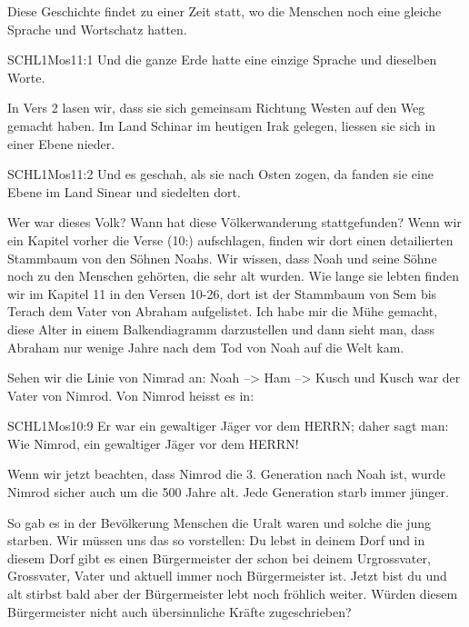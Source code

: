 \documentclass[12pt]{../../inc/mybib}
\newenvironment{block}[1][]{%
  \vspace{1.5em}%
  \noindent\textbf{#1}\par%
  \vspace{0.0em}%
}{%
  \vspace{1em}%
}
\begin{document}
    \vspace{1em}
    \begin{block}
    Diese Geschichte findet zu einer Zeit statt, wo die Menschen noch eine gleiche Sprache und Wortschatz hatten.
    \begin{bibelbox}{SCHL}{1Mos}{11:1}
        Und die ganze Erde hatte eine einzige Sprache und dieselben Worte.
    \end{bibelbox}    
    In Vers 2 lasen wir, dass sie sich gemeinsam Richtung Westen auf den Weg gemacht haben. Im Land Schinar im heutigen Irak gelegen, liessen sie sich in einer Ebene nieder.    
    \begin{bibelbox}{SCHL}{1Mos}{11:2}
        Und es geschah, als sie nach Osten zogen, da fanden sie eine Ebene im Land Sinear und siedelten dort.
    \end{bibelbox}
    Wer war dieses Volk? Wann hat diese Völkerwanderung stattgefunden? Wenn wir ein Kapitel vorher die Verse  (10:) aufschlagen, finden wir dort einen detailierten Stammbaum von den Söhnen Noahs. Wir wissen, dass Noah und seine Söhne noch zu den Menschen gehörten, die sehr alt wurden. Wie lange sie lebten finden wir im Kapitel 11 in den Versen 10-26, dort ist der Stammbaum von Sem bis Terach dem Vater von Abraham aufgelistet. Ich habe mir die Mühe gemacht, diese Alter in einem Balkendiagramm darzustellen und dann sieht man, dass Abraham nur wenige Jahre nach dem Tod von Noah auf die Welt kam. 

    
    Sehen wir die Linie von Nimrad an: Noah --> Ham --> Kusch und Kusch war der Vater von Nimrod.
    Von Nimrod heisst es in:
    \begin{bibelbox}{SCHL}{1Mos}{10:9}
        Er war ein gewaltiger Jäger vor dem HERRN; daher sagt man: Wie Nimrod, ein gewaltiger Jäger vor dem HERRN!
    \end{bibelbox}
    Wenn wir jetzt beachten, dass Nimrod die 3. Generation nach Noah ist, wurde Nimrod sicher auch um die 500 Jahre alt. Jede Generation starb immer jünger. 
\end{block}
\begin{block}
    So gab es in der Bevölkerung Menschen die Uralt waren und solche die jung starben. Wir müssen uns das so vorstellen:  Du lebst in deinem Dorf und in diesem Dorf gibt es einen Bürgermeister der schon bei deinem Urgrossvater, Grossvater, Vater und aktuell immer noch Bürgermeister ist. Jetzt bist du und alt stirbst bald aber der Bürgermeister lebt noch fröhlich weiter. Würden diesem Bürgermeister nicht auch übersinnliche Kräfte zugeschrieben? 
\end{block}
\end{document}
